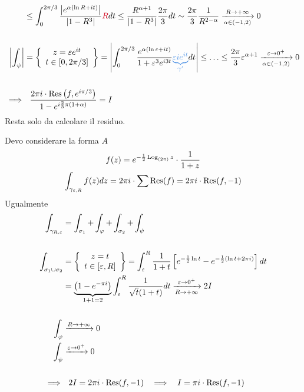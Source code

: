 \begin{equation*}
\begin{aligned}
 & \leq \int^{2\pi /3}_{0}\frac{\left| e^{\alpha (\ln R + it)}\right|}{\left| 1 - R^{3}\right|}\textcolor[rgb]{0.82, 0.01, 0.11}{R} dt \leq \frac{R^{\alpha + 1}}{\left| 1 - R^{3}\right|}\frac{2\pi}{3} dt\sim \frac{2\pi}{3}\frac{1}{R^{2 - \alpha}}\xrightarrow[\alpha \in (- 1, 2)]{R\rightarrow + \infty} 0\\
 & \\
\left| \int_{\psi}\right| & = \left\{
\begin{array}{c}
z = \varepsilon e^{it}\\
t\in [ 0, 2\pi /3]
\end{array}\right\} = \left| \int^{2\pi /3}_{0}\frac{e^{\alpha (\ln \varepsilon + it)}}{1 + \varepsilon^{3} e^{i3t}}\textcolor[rgb]{0.29, 0.56, 0.89}{\underbrace{\varepsilon ie^{it}}_{\gamma'}} dt\right| \leq \dotsc \leq \frac{2\pi}{3} \varepsilon^{\alpha + 1}\xrightarrow[\alpha \in (- 1, 2)]{\varepsilon \rightarrow 0^{+}} 0\\
 & \\
\implies & \ \ \frac{2\pi i \cdot \Res \left(f, e^{i\pi /3}\right)}{1 - e^{i\frac{2}{3} \pi (1 + \alpha)}} = I
\end{aligned}
\end{equation*}
Resta solo da calcolare il residuo.

\Soluzione

Devo considerare la forma $A$
\begin{gather*}
f(z) = e^{- \frac{1}{2}\operatorname{Log}_{(2\pi)} z} \cdot \frac{1}{1 + z}\\
\int_{\gamma_{\varepsilon, R}} f(z) dz = 2\pi i \cdot \sum \operatorname{Res} (f) = 2\pi i \cdot \operatorname{Res} (f, - 1)
\end{gather*}
Ugualmente
\begin{equation*}
\begin{aligned}
\int_{\gamma_{R, \varepsilon}} & = \int_{\sigma_{1}} + \int_{\varphi} + \int_{\sigma_{2}} + \int_{\psi}\\
 & \\
\int_{\sigma_{1} \cup \sigma_{2}} & = \left\{
\begin{array}{c}
z = t\\
t\in [ \varepsilon, R]
\end{array}\right\} = \int^{R}_{\varepsilon}\frac{1}{1 + t}\left[ e^{- \frac{1}{2}\ln t} - e^{- \frac{1}{2}(\ln t + 2\pi i)}\right] dt\\
 & = \underbrace{\left(1 - e^{- \pi i}\right)}_{1 + 1 = 2}\int^{R}_{\varepsilon}\frac{1}{\sqrt{t}(1 + t)} dt\xrightarrow[R\rightarrow + \infty ]{\varepsilon \rightarrow 0^{+}} 2I\\
 & \\
\int_{\varphi} & \xrightarrow{R\rightarrow + \infty} 0\\
\int_{\psi} & \xrightarrow{\varepsilon \rightarrow 0^{+}} 0\\
 & \\
\implies & \ \ 2I = 2\pi i \cdot \operatorname{Res} (f, - 1) \ \ \implies \ \ I = \pi i \cdot \operatorname{Res} (f, - 1)
\end{aligned}
\end{equation*}

